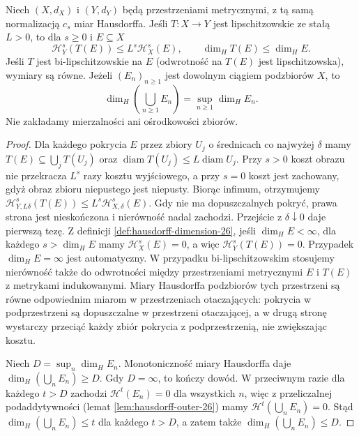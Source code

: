 \begin{twierdzenie}
\label{it:thm:hausdorff-lipschitz-dimension}
Niech $(X,d_X)$ i $(Y,d_Y)$ będą przestrzeniami metrycznymi,
z tą samą normalizacją $c_s$ miar Hausdorffa.
Jeśli $T:X\to Y$ jest lipschitzowskie ze stałą $L>0$,
to dla $s\ge0$ i $E\subseteq X$
\[
 \mathcal H_Y^s(T(E))\le L^s\mathcal H_X^s(E),
 \qquad \dim_H T(E)\le\dim_H E.
\]
Jeśli $T$ jest bi-lipschitzowskie na $E$ (odwrotność na
$T(E)$ jest lipschitzowska), wymiary są równe.
Jeżeli $(E_n)_{n\ge1}$ jest dowolnym ciągiem podzbiorów $X$,
to
\[
 \dim_H\left(\bigcup_{n\ge1}E_n\right)
 =\sup_{n\ge1}\dim_H E_n.
\]
Nie zakładamy mierzalności ani ośrodkowości zbiorów.
\end{twierdzenie}
\begin{proof}
Dla każdego pokrycia $E$ przez zbiory $U_j$
o średnicach co najwyżej $\delta$ mamy
$T(E)\subseteq\bigcup_j T(U_j)$ oraz
$\operatorname{diam}T(U_j)\le L\operatorname{diam}U_j$.
Przy $s>0$ koszt obrazu nie przekracza $L^s$ razy
kosztu wyjściowego, a przy $s=0$ koszt jest zachowany,
gdyż obraz zbioru niepustego jest niepusty.
Biorąc infimum, otrzymujemy
$\mathcal H^s_{Y,L\delta}(T(E))
\le L^s\mathcal H^s_{X,\delta}(E)$.
Gdy nie ma dopuszczalnych pokryć, prawa strona jest
nieskończona i nierówność nadal zachodzi.
Przejście z $\delta\downarrow0$ daje pierwszą tezę.
Z definicji \ref{def:hausdorff-dimension-26}, jeśli
$\dim_HE<\infty$, dla każdego $s>\dim_HE$ mamy
$\mathcal H^s_X(E)=0$, a więc $\mathcal H^s_Y(T(E))=0$.
Przypadek $\dim_HE=\infty$ jest automatyczny.
W przypadku bi-lipschitzowskim stosujemy nierówność
także do odwrotności między przestrzeniami metrycznymi
$E$ i $T(E)$ z metrykami indukowanymi.
Miary Hausdorffa podzbiorów tych przestrzeni są równe
odpowiednim miarom w przestrzeniach otaczających:
pokrycia w podprzestrzeni są dopuszczalne w przestrzeni
otaczającej, a w drugą stronę wystarczy przeciąć każdy
zbiór pokrycia z podprzestrzenią, nie zwiększając kosztu.

Niech $D=\sup_n\dim_HE_n$. Monotoniczność miary
Hausdorffa daje $\dim_H(\bigcup_n E_n)\ge D$.
Gdy $D=\infty$, to kończy dowód. W przeciwnym razie
dla każdego $t>D$ zachodzi $\mathcal H^t(E_n)=0$
dla wszystkich $n$, więc z przeliczalnej podaddytywności
(lemat \ref{lem:hausdorff-outer-26}) mamy
$\mathcal H^t(\bigcup_n E_n)=0$.
Stąd $\dim_H(\bigcup_nE_n)\le t$ dla każdego $t>D$,
a zatem także $\dim_H(\bigcup_nE_n)\le D$.
\end{proof}

